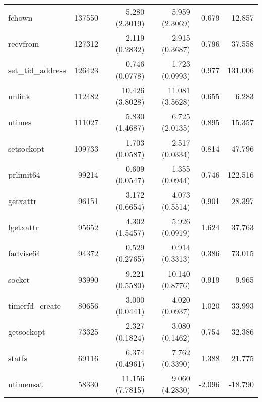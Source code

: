 \begin{longtable}{>{\ttfamily}lrrrrr}
                         fchown &     137550 &              5.280 (2.3019) &            5.959 (2.3069) &           0.679 &       12.857 \\
                       recvfrom &     127312 &              2.119 (0.2832) &            2.915 (0.3687) &           0.796 &       37.558 \\
              set\_tid\_address &     126423 &              0.746 (0.0778) &            1.723 (0.0993) &           0.977 &      131.006 \\
                         unlink &     112482 &             10.426 (3.8028) &           11.081 (3.5628) &           0.655 &        6.283 \\
                         utimes &     111027 &              5.830 (1.4687) &            6.725 (2.0135) &           0.895 &       15.357 \\
                     setsockopt &     109733 &              1.703 (0.0587) &            2.517 (0.0334) &           0.814 &       47.796 \\
                      prlimit64 &      99214 &              0.609 (0.0547) &            1.355 (0.0944) &           0.746 &      122.516 \\
                       getxattr &      96151 &              3.172 (0.6654) &            4.073 (0.5514) &           0.901 &       28.397 \\
                      lgetxattr &      95652 &              4.302 (1.5457) &            5.926 (0.0919) &           1.624 &       37.763 \\
                      fadvise64 &      94372 &              0.529 (0.2765) &            0.914 (0.3313) &           0.386 &       73.015 \\
                         socket &      93990 &              9.221 (0.5580) &           10.140 (0.8776) &           0.919 &        9.965 \\
                timerfd\_create &      80656 &              3.000 (0.0441) &            4.020 (0.0937) &           1.020 &       33.993 \\
                     getsockopt &      73325 &              2.327 (0.1824) &            3.080 (0.1462) &           0.754 &       32.386 \\
                         statfs &      69116 &              6.374 (0.4961) &            7.762 (0.3390) &           1.388 &       21.775 \\
                      utimensat &      58330 &             11.156 (7.7815) &            9.060 (4.2830) &          -2.096 &      -18.790 \\

\end{longtable}
